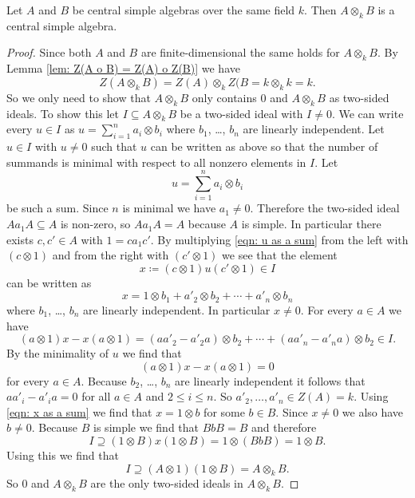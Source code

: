\begin{prop}
  Let $A$ and $B$ be central simple algebras over the same field $k$.
  Then $A \otimes_k B$ is a central simple algebra.
\end{prop}
\begin{proof}
  Since both $A$ and $B$ are finite-dimensional the same holds for $A \otimes_k B$.
  By Lemma \ref{lem: Z(A o B) = Z(A) o Z(B)} we have
  \[
      Z(A \otimes_k B)
    = Z(A) \otimes_k Z(B
    = k \otimes_k k
    = k.
  \]
  So we only need to show that $A \otimes_k B$ only contains $0$ and $A \otimes_k B$ as two-sided ideals.
  To show this let $I \subseteq A \otimes_k B$ be a two-sided ideal with $I \neq 0$.
  We can write every $u \in I$ as $u = \sum_{i=1}^n a_i \otimes b_i$ where $b_1$, \dots, $b_n$ are linearly independent.
  Let $u \in I$ with $u \neq 0$ such that $u$ can be written as above so that the number of summands is minimal with respect to all nonzero elements in $I$.
  Let
  \begin{equation}\label{eqn: u as a sum}
    u = \sum_{i=1}^n a_i \otimes b_i
  \end{equation}
  be such a sum.
  Since $n$ is minimal we have $a_1 \neq 0$.
  Therefore the two-sided ideal $A a_1 A \subseteq A$ is non-zero, so $A a_1 A = A$ because $A$ is simple.
  In particular there exists $c, c' \in A$ with $1 = c a_1 c'$.
  By multiplying \eqref{eqn: u as a sum} from the left with $(c \otimes 1)$ and from the right with $(c' \otimes 1)$ we see that the element
  \[
              x
    \coloneqq (c \otimes 1) u (c' \otimes 1)
    \in       I
  \]
  can be written as
  \begin{equation}\label{eqn: x as a sum}
        x
    =   1 \otimes b_1
      + a'_2 \otimes b_2
      + \dotsb
      + a'_n \otimes b_n
  \end{equation}
  where $b_1$, \dots, $b_n$ are linearly independent.
  In particular $x \neq 0$.
  For every $a \in A$ we have
  \[
        (a \otimes 1) x - x (a \otimes 1)
    =   (a a'_2 - a'_2 a) \otimes b_2
      + \dotsb
      + (a a'_n - a'_n a) \otimes b_2 \in I.
  \]
  By the minimality of $u$ we find that
  \[
      (a \otimes 1) x - x (a \otimes 1)
    = 0
  \]
  for every $a \in A$.
  Because $b_2$, \dots, $b_n$ are linearly independent it follows that $a a'_i - a'_i a = 0$ for all $a \in A$ and $2 \leq i \leq n$.
  So $a'_2, \dotsc, a'_n \in Z(A) = k$.
  Using \eqref{eqn: x as a sum} we find that $x = 1 \otimes b$ for some $b \in B$.
  Since $x \neq 0$ we also have $b \neq 0$.
  Because $B$ is simple we find that $BbB = B$ and therefore
  \[
              I
    \supseteq (1 \otimes B) x (1 \otimes B)
    =         1 \otimes (BbB)
    =         1 \otimes B.
  \]
  Using this we find that
  \[
              I
    \supseteq (A \otimes 1) (1 \otimes B)
    =         A \otimes_k B.
  \]
  So $0$ and $A \otimes_k B$ are the only two-sided ideals in $A \otimes_k B$.
\end{proof}





